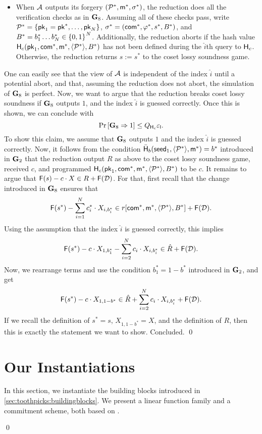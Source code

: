 \documentclass[version=final]{iacrcc}
\renewenvironment{proof}{\begin{oldproof}}{\qed\end{oldproof}}
\theoremstyle{mytheorem}				\newtheorem{theorem}{Theorem}
\theoremstyle{myplain}
\theoremstyle{mydefinition}
\theoremstyle{myremark}
\begin{document}
\begin{proof}[of \cref{lemma:toothpicks:tight:completeness}]
\begin{proof}
\begin{itemize}
		\item When $\mathcal{A}$ outputs its forgery $({\mathcal{P}}^*,\mathsf{m}^*,\sigma^*)$, the reduction does all the verification checks as in $\mbox{\textbf{G}}_8$. 
		Assuming all of these checks pass, write ${\mathcal{P}}^* = \{{\mathsf{pk}}_1={\mathsf{pk}}^*,\dots,{\mathsf{pk}}_N\}$, $\sigma^* = (\mathsf{com}^*,\varphi^*,s^*,B^*)$, and $B^* = b^*_1\dots b^*_N \in {\ensuremath{{\{0,1\}}^{\relax}}}^N$.
		Additionally, the reduction aborts if the hash value $\Hash_c(\pk_1,\com^*,\mes^*,\encode{\PKList^*},B^*)$ has not been defined during the $\hat{i}$th query to $\mathsf{H}_c$.
		Otherwise, the reduction returns $s := s^*$ to the coset lossy soundness game.
	\end{itemize}
	One can easily see that the view of $\mathcal{A}$ is independent of the index $\hat{i}$ until a potential abort, and that, assuming the reduction does not abort, the simulation of $\mbox{\textbf{G}}_8$ is perfect.
	Now, we want to argue that the reduction breaks coset lossy soundness if $\mbox{\textbf{G}}_8$ outputs $1$, and the index $\hat{i}$ is guessed correctly.
	Once this is shown, we can conclude with \[
		{\Pr\left[{\mbox{\textbf{G}}_8 \Rightarrow 1}\right]} \leq Q_{\mathsf{H}_c}\varepsilon_{\mathsf{l}}.
	\]
	To show this claim, we assume that $\mbox{\textbf{G}}_8$ outputs $1$ and the index $\hat{i}$ is guessed correctly. 
	Now, it follows from the condition $\bar{\Hash}_b(\seed_1,\encode{\PKList^*},\mes^*) = b^*$ introduced in $\mbox{\textbf{G}}_2$ that the reduction output $R$ as above to the coset lossy soundness game, received $c$, and programmed 
	$\Hash_c(\pk_1,\com^*,\mes^*,\encode{\PKList^*},B^*)$ to be $c$.
	It remains to argue that ${\mathsf{F}}(s) - c\cdot X \in R + {\mathsf{F}}(\mathcal D)$.
	For that, first recall that the change introduced in $\mbox{\textbf{G}}_8$ ensures that \[
	    \LFunction(s^*)-\sum_{i=1}^N c^*_{i}\cdot X_{i,b^*_i} \in r[\com^*,\mes^*,\encode{\PKList^*},B^*] + \LFunction(\DDD).
	\]
	Using the assumption that the index $\hat{i}$ is guessed correctly, this implies  \[
	    {\mathsf{F}}(s^*)- c\cdot X_{1,b^*_1} - \sum_{i=2}^N c_{i}\cdot X_{i,b^*_i} \in \hat{R} + {\mathsf{F}}(\mathcal D).
	\]
	Now, we rearrange terms and use the condition $b^*_1 = 1-b^*$ introduced in $\mbox{\textbf{G}}_2$, and get \[
		{\mathsf{F}}(s^*)- c\cdot X_{1,1-b^*} \in \hat{R} + \sum_{i=2}^N c_{i}\cdot X_{i,b^*_i} + {\mathsf{F}}(\mathcal D).
	\]
	If we recall the definition of $s^* = s$, $X_{1,1-b^*} = X$, and the definition of $R$, then this is exactly the statement we want to show. Concluded.
\end{proof} \section{Our Instantiations}
In this section, we instantiate the building blocks introduced in \cref{sec:toothpicks:buildingblocks}.
We present a linear function family and a commitment scheme, both based on \ddh.

\end{proof}
\end{document}
